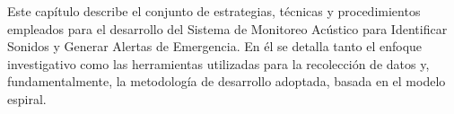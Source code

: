 
Este capítulo describe el conjunto de estrategias, técnicas y procedimientos empleados para el desarrollo del Sistema de Monitoreo Acústico para Identificar Sonidos y Generar Alertas de Emergencia. En él se detalla tanto el enfoque investigativo como las herramientas utilizadas para la recolección de datos y, fundamentalmente, la metodología de desarrollo adoptada, basada en el modelo espiral.






